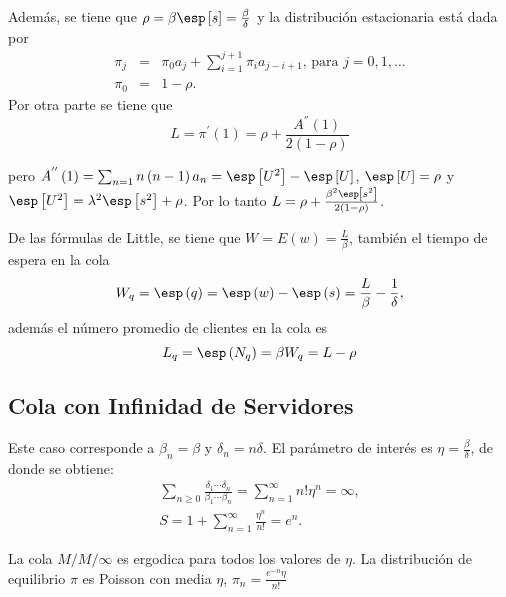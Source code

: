 Adem\'as, se tiene que $\rho=\beta\esp\left[s\right]=\frac{\beta}{\delta}$ y la distribuci\'on estacionaria est\'a dada por
\begin{eqnarray}
\pi_{j}&=&\pi_{0}a_{j}+\sum_{i=1}^{j+1}\pi_{i}a_{j-i+1}\textrm{, para }j=0,1,\ldots\\
\pi_{0}&=&1-\rho.
\end{eqnarray}
Por otra parte se tiene que\begin{equation}
L=\pi^{'}\left(1\right)=\rho+\frac{A^{''}\left(1\right)}{2\left(1-\rho\right)}
\end{equation}

pero $A^{''}\left(1\right)=\sum_{n=1}n\left(n-1\right)a_{n}= \esp\left[U^{2}\right]-\esp\left[U\right]$, $\esp\left[U\right]=\rho$ y
$\esp\left[U^{2}\right]=\lambda^{2}\esp\left[s^{2}\right]+\rho$.
Por lo tanto $L=\rho+\frac{\beta^{2}\esp\left[s^{2}\right]}{2\left(1-\rho\right)}$.

De las f\'ormulas de Little, se tiene que $W=E\left(w\right)=\frac{L}{\beta}$, tambi\'en el tiempo de espera en la cola
\begin{equation}
W_{q}=\esp\left(q\right)=\esp\left(w\right)-\esp\left(s\right)=\frac{L}{\beta}-\frac{1}{\delta},
\end{equation}
adem\'as el n\'umero promedio de clientes en la cola es
\begin{equation}
L_{q}=\esp\left(N_{q}\right)=\beta W_{q}=L-\rho
\end{equation}


\subsection{Cola con Infinidad de Servidores}

Este caso corresponde a $\beta_{n}=\beta$ y $\delta_{n}=n\delta$. El par\'ametro de inter\'es es $\eta=\frac{\beta}{\delta}$, de donde se obtiene:
\begin{eqnarray*}
\sum_{n\geq0}\frac{\delta_{1}\cdots\delta_{n}}{\beta_{1}\cdots\beta_{n}}=\sum_{n=1}^{\infty}n!\eta^{n}=\infty,\\
S=1+\sum_{n=1}^{\infty}\frac{\eta^{n}}{n!}=e^{n}.
\end{eqnarray*}

\begin{Prop}
La cola $M/M/\infty$ es ergodica para todos los valores de $\eta$. La distribuci\'on de equilibrio $\pi$ es Poisson con media $\eta$, $\pi_{n}=\frac{e^{-n}\eta}{n!}$
\end{Prop}



